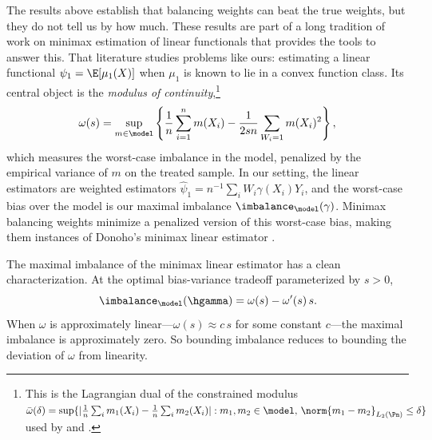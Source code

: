 
The results above establish that balancing weights can beat the true weights, but they do not tell us by how much. These results are part of a long tradition of work on minimax estimation of linear functionals \citep{ibragimov1985nonparametric, donoho1991geometrizing, donoho1994statistical, armstrong2018optimal} that provides the tools to answer this. That literature studies problems like ours: estimating a linear functional $\psi_1 = \E[\mu_1(X)]$ when $\mu_1$ is known to lie in a convex function class. Its central object is the \emph{modulus of continuity},\footnote{This is the Lagrangian dual of the constrained modulus $\bar\omega(\delta) = \sup\{|\frac{1}{n}\sum_i m_1(X_i) - \frac{1}{n}\sum_i m_2(X_i)| : m_1, m_2 \in \model,\, \norm{m_1 - m_2}_{L_2(\Pn)} \le \delta\}$ used by \citet{donoho1994statistical} and \citet{armstrong2018optimal}.}
\begin{equation}
\label{eq:modulus-of-continuity}
\omega(s) = \sup_{m \in \model} \left\{ \frac{1}{n}\sum_{i=1}^n m(X_i) - \frac{1}{2sn} \sum_{W_i=1} m(X_i)^2 \right\},
\end{equation}
which measures the worst-case imbalance in the model, penalized by the empirical variance of $m$ on the treated sample. In our setting, the linear estimators are weighted estimators $\hat\psi_1 = n^{-1}\sum_i W_i \gamma(X_i) Y_i$, and the worst-case bias over the model is our maximal imbalance $\imbalance_\model(\gamma)$. Minimax balancing weights minimize a penalized version of this worst-case bias, making them instances of Donoho's minimax linear estimator \citep{donoho1994statistical, armstrong2018optimal}.

The maximal imbalance of the minimax linear estimator has a clean characterization. At the optimal bias-variance tradeoff parameterized by $s > 0$,
\begin{equation}
\label{eq:donoho-liu-bias}
\imbalance_\model(\hgamma) = \omega(s) - \omega'(s)\,s.
\end{equation}
When $\omega$ is approximately linear---$\omega(s) \approx c\,s$ for some constant $c$---the maximal imbalance is approximately zero. So bounding imbalance reduces to bounding the deviation of $\omega$ from linearity.
